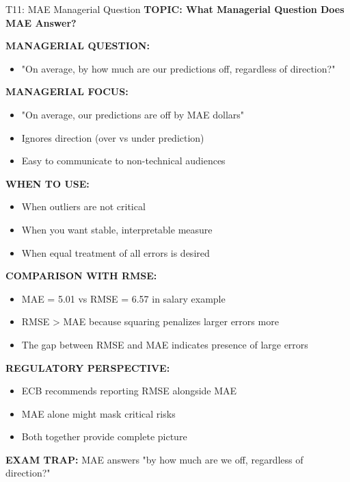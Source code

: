 \documentclass[8pt]{beamer}
\begin{document}
	\begin{frame}{T11: MAE Managerial Question}
		\fontsize{6.5}{7.5}\selectfont
		\textbf{TOPIC: What Managerial Question Does MAE Answer?}
		
		\vspace{0.1cm}
		\textbf{MANAGERIAL QUESTION:}
		\begin{itemize}
			\item "On average, by how much are our predictions off, regardless of direction?"
		\end{itemize}
		
		\vspace{0.1cm}
		\textbf{MANAGERIAL FOCUS:}
		\begin{itemize}
			\item "On average, our predictions are off by MAE dollars"
			\item Ignores direction (over vs under prediction)
			\item Easy to communicate to non-technical audiences
		\end{itemize}
		
		\vspace{0.1cm}
		\textbf{WHEN TO USE:}
		\begin{itemize}
			\item When outliers are not critical
			\item When you want stable, interpretable measure
			\item When equal treatment of all errors is desired
		\end{itemize}
		
		\vspace{0.1cm}
		\textbf{COMPARISON WITH RMSE:}
		\begin{itemize}
			\item MAE = 5.01 vs RMSE = 6.57 in salary example
			\item RMSE > MAE because squaring penalizes larger errors more
			\item The gap between RMSE and MAE indicates presence of large errors
		\end{itemize}
		
		\vspace{0.1cm}
		\textbf{REGULATORY PERSPECTIVE:}
		\begin{itemize}
			\item ECB recommends reporting RMSE alongside MAE
			\item MAE alone might mask critical risks
			\item Both together provide complete picture
		\end{itemize}
		
		\textcolor{myred}{\textbf{EXAM TRAP:}} MAE answers \textcolor{myblue}{"by how much are we off, regardless of direction?"}
	\end{frame}
	
\end{document}
